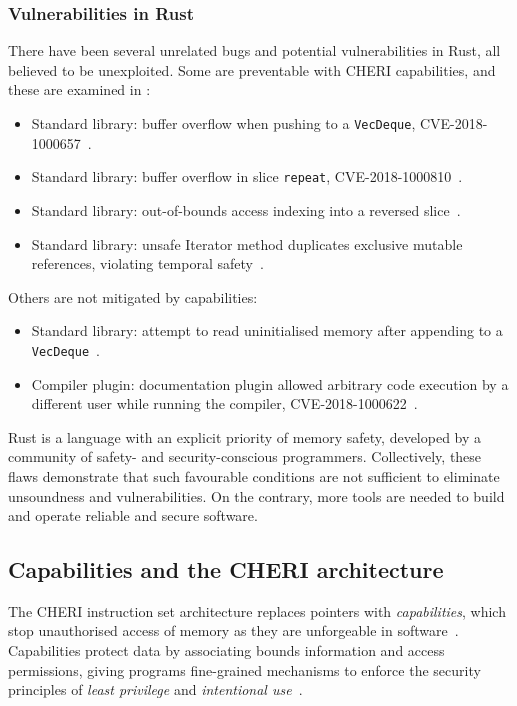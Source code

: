 \documentclass[dissertation.tex]{subfiles}
\begin{document}
\subsubsection{Vulnerabilities in Rust}
There have been several unrelated bugs and potential vulnerabilities in
Rust, all believed to be unexploited.
Some are preventable with CHERI capabilities, and these are examined in
:

\begin{itemize}
    \item Standard library: buffer overflow when pushing to a
    \texttt{VecDeque}, CVE-2018-1000657~\cite{cve-push,rust-issue-push}.
    \item Standard library: buffer overflow in slice \texttt{repeat},
    CVE-2018-1000810~\cite{cve-repeat,rust-advisory-repeat,rust-pr-slice}.
    \item Standard library: out-of-bounds access indexing into a
    reversed slice~\cite{rust-pr-reverse,rust-commit-reverse}.
    \item Standard library: unsafe Iterator method duplicates
    exclusive mutable references, violating temporal
    safety~\cite{rust-issue-vec-mut}.
\end{itemize}

Others are not mitigated by capabilities:

\begin{itemize}
    \item Standard library: attempt to read uninitialised memory after
    appending to a \texttt{VecDeque}~\cite{rust-issue-deque-append}.
    \item Compiler plugin: documentation plugin allowed arbitrary code
    execution by a different user while running the
    compiler, CVE-2018-1000622~\cite{cve-rustdoc,rust-advisory-rustdoc}.
\end{itemize}

Rust is a language with an explicit priority of memory safety, developed
by a community of safety- and security-conscious programmers.
Collectively, these flaws demonstrate that such favourable conditions
are not sufficient to eliminate unsoundness and vulnerabilities.
On the contrary, more tools are needed to build and operate reliable and
secure software.


\subsection{Capabilities and the CHERI architecture}
The CHERI instruction set architecture replaces pointers with
\emph{capabilities}, which stop unauthorised access of memory as they are
unforgeable in software~\cite{cheri-v6}.
Capabilities protect data by associating bounds information and access
permissions, giving programs fine-grained mechanisms to enforce the
security principles of \emph{least privilege} and \emph{intentional
use}~\cite{neumann-principles}.
\end{document}
